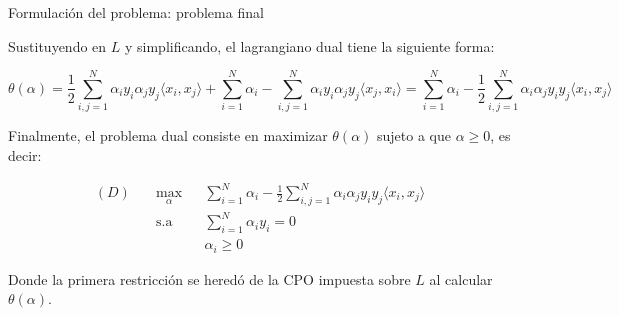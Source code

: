 \documentclass[9pt]{beamer}
\begin{document}
\begin{frame}{Formulación del problema: problema final}

Sustituyendo en $L$ y simplificando, el lagrangiano dual tiene la siguiente forma:

\begin{equation*}
	\theta(\alpha) = \frac{1}{2} \sum_{i,j=1}^N \alpha_i y_i \alpha_j y_j \langle x_i,x_j\rangle + \sum_{i=1}^N \alpha_i - \sum_{i,j=1}^N \alpha_i y_i \alpha_j y_j \langle x_j,x_i\rangle = \sum_{i=1}^N \alpha_i - \frac{1}{2} \sum_{i,j=1}^N \alpha_i \alpha_j y_i y_j \langle x_i,x_j\rangle
\end{equation*}\pause

Finalmente, el problema dual consiste en maximizar $\theta(\alpha)$ sujeto a que $\alpha\geq 0$, es decir:


\begin{equation*}
\begin{aligned}
(D)\quad & \underset{\alpha}{\max}
& & \sum\limits_{i=1}^{N}\alpha_i - \frac{1}{2} \sum\limits_{i,j=1}^{N} \alpha_i \alpha_j y_i y_j \langle x_i, x_j\rangle\\
& \text{s.a}
& & \sum\limits_{i=1}^{N} \alpha_i y_i= 0 \\
& &  &\alpha_i \geq 0
\end{aligned}
\end{equation*}

Donde la primera restricción se heredó de la CPO impuesta sobre $L$ al calcular $\theta(\alpha)$.
	
\end{frame}
\end{document}
